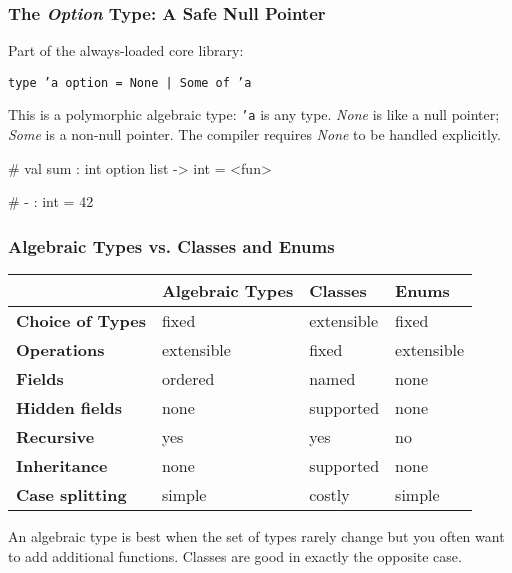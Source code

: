 \documentclass{plt}
\begin{document}
\begin{frame}[fragile]
  \frametitle{The \emph{Option} Type: A Safe Null Pointer}

Part of the always-loaded core library:

\begin{center}
\texttt{type 'a option = None | Some of 'a}
\end{center}

This is a polymorphic algebraic type: \texttt{'a} is any type.
\emph{None} is like a null pointer; \emph{Some} is a non-null pointer.
The compiler requires \emph{None} to be handled explicitly.

\begin{interactive}
# 
val sum : int option list -> int = <fun>

# 
- : int = 42
\end{interactive}

\end{frame}

\begin{frame}
  \frametitle{Algebraic Types vs. Classes and Enums}

\begin{tabular}{llll}
\toprule
& \textbf{Algebraic Types} & \textbf{Classes} & \textbf{Enums} \\
\midrule
\textbf{Choice of Types} & fixed & extensible & fixed \\
\textbf{Operations} & extensible & fixed & extensible \\[5pt]
\textbf{Fields} & ordered & named & none \\
\textbf{Hidden fields} & none & supported & none \\
\textbf{Recursive} & yes & yes & no \\
\textbf{Inheritance} & none & supported & none \\
\textbf{Case splitting} & simple & costly & simple \\
\bottomrule
\end{tabular}

\medskip

An algebraic type is best when the set of types rarely change but you
often want to add additional functions.  Classes are good in exactly
the opposite case.

\end{frame}
\end{document}
